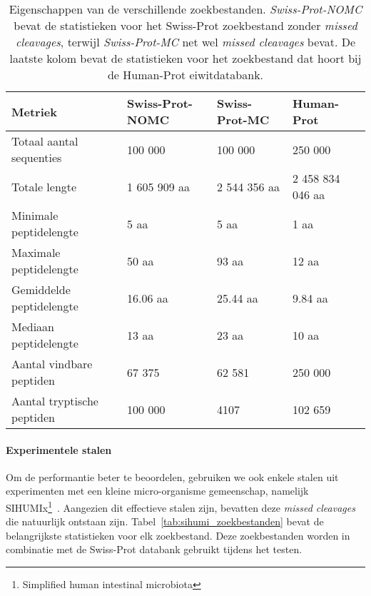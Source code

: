 \begin{table}[H]
    \centering
    \begin{tabular}{l l l l}
        Metriek                    & Swiss-Prot-NOMC & Swiss-Prot-MC & Human-Prot       \\
        \hline\hline
        Totaal aantal sequenties   & 100 000         & 100 000       & 250 000          \\
        Totale lengte              & 1 605 909 aa    & 2 544 356 aa  & 2 458 834 046 aa \\
        Minimale peptidelengte     & 5 aa            & 5 aa          & 1 aa             \\
        Maximale peptidelengte     & 50 aa           & 93 aa         & 12 aa            \\
        Gemiddelde peptidelengte   & 16.06 aa        & 25.44 aa      & 9.84 aa          \\
        Mediaan peptidelengte      & 13 aa           & 23 aa         & 10 aa            \\
        Aantal vindbare peptiden   & 67 375          & 62 581        & 250 000          \\
        Aantal tryptische peptiden & 100 000         & 4107          & 102 659          \\
        \hline
    \end{tabular}
    \caption{Eigenschappen van de verschillende zoekbestanden. \textit{Swiss-Prot-NOMC} bevat de statistieken voor het Swiss-Prot zoekbestand zonder \textit{missed cleavages}, terwijl \textit{Swiss-Prot-MC} net wel \textit{missed cleavages} bevat. De laatste kolom bevat de statistieken voor het zoekbestand dat hoort bij de Human-Prot eiwitdatabank.}
    \label{tab:artifiele_bestanden_statistieken}
\end{table}

\paragraph{Experimentele stalen}
Om de performantie beter te beoordelen, gebruiken we ook enkele stalen uit experimenten met een kleine micro-organisme gemeenschap, namelijk SIHUMIx\footnote{Simplified human intestinal microbiota}~\cite{SIHUMI_first_introduction, SIHUMI_frequently_used}.
Aangezien dit effectieve stalen zijn, bevatten deze \textit{missed cleavages} die natuurlijk ontstaan zijn.
Tabel~\ref{tab:sihumi_zoekbestanden} bevat de belangrijkste statistieken voor elk zoekbestand.
Deze zoekbestanden worden in combinatie met de Swiss-Prot databank gebruikt tijdens het testen.

